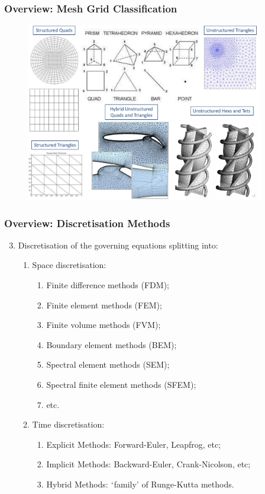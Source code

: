\documentclass[10pt,compress,handout,ignorenonframetext]{beamer}
\begin{document}
\begin{frame}
 \frametitle{Overview: Mesh Grid Classification}

   \begin{figure}%
    \begin{center}
     \includegraphics[width=12.cm, height=7.8cm, clip]{./Figs/MeshGrid_Examples.pdf}\label{xx}
    \end{center}
   \end{figure}    

\end{frame}

\begin{frame}
 \frametitle{Overview: Discretisation Methods} 
\begin{enumerate}
  \setcounter{enumi}{2}
  \item <1-> Discretisation of the governing equations splitting into:
    \begin{enumerate}
      \item <2-> Space discretisation:
        \begin{enumerate}
          \item <4-> Finite difference methods (FDM); 
          \item <5-> Finite element methods (FEM); 
          \item <6-> Finite volume methods (FVM); 
          \item <7-> Boundary element methods (BEM); 
          \item <8-> Spectral element methods (SEM); 
          \item <9-> Spectral finite element methods (SFEM); 
          \item <10-> etc. 
        \end{enumerate}
      \item <3-> Time discretisation:
        \begin{enumerate}
          \item <11-> Explicit Methods: Forward-Euler, Leapfrog, etc;
          \item <12-> Implicit Methods: Backward-Euler, Crank-Nicolson, etc;
          \item <13-> Hybrid Methods: $\lq$family' of Runge-Kutta methods.
        \end{enumerate}
    \end{enumerate}
\end{enumerate}
\end{frame}
\end{document}
